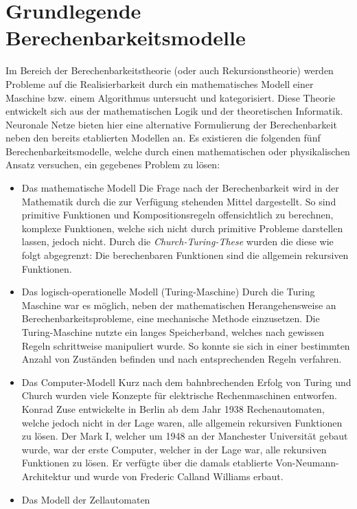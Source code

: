 \section{Grundlegende Berechenbarkeitsmodelle}
\label{sec:neuro_models}
	Im Bereich der Berechenbarkeitstheorie (oder auch Rekursionstheorie) werden Probleme auf die Realisierbarkeit durch ein mathematisches Modell einer Maschine bzw. einem Algorithmus untersucht und kategorisiert. Diese Theorie entwickelt sich aus der mathematischen Logik und der theoretischen Informatik. Neuronale Netze bieten hier eine alternative Formulierung der Berechenbarkeit neben den bereits etablierten Modellen an. Es existieren die folgenden fünf Berechenbarkeitsmodelle, welche durch einen mathematischen oder physikalischen Ansatz versuchen, ein gegebenes Problem zu lösen:
	\begin{itemize}
		\item Das mathematische Modell
			\subitem Die Frage nach der Berechenbarkeit wird in der Mathematik durch die zur Verfügung stehenden Mittel dargestellt. So sind primitive Funktionen und Kompositionsregeln offensichtlich zu berechnen, komplexe Funktionen, welche sich nicht durch primitive Probleme darstellen lassen, jedoch nicht. Durch die \textit{Church-Turing-These} \cite{Turing1936} wurden die diese wie folgt abgegrenzt: \glqq Die berechenbaren Funktionen sind die allgemein rekursiven Funktionen.\grqq
			\newpage
		\item Das logisch-operationelle Modell (Turing-Maschine)
			\subitem Durch die Turing Maschine \cite{Turing1936} war es möglich, neben der mathematischen Herangehensweise an Berechenbarkeitsprobleme, eine mechanische Methode einzusetzen. Die Turing-Maschine nutzte ein langes Speicherband, welches nach gewissen Regeln schrittweise manipuliert wurde. So konnte sie sich in einer bestimmten Anzahl von Zuständen befinden und nach entsprechenden Regeln verfahren.
		\item Das Computer-Modell
			\subitem Kurz nach dem bahnbrechenden Erfolg von Turing und Church wurden viele Konzepte für elektrische Rechenmaschinen entworfen. Konrad Zuse entwickelte in Berlin ab dem Jahr 1938 Rechenautomaten, welche jedoch nicht in der Lage waren, alle allgemein rekursiven Funktionen zu lösen. Der Mark I, welcher um 1948 an der Manchester Universität gebaut wurde, war der erste Computer, welcher in der Lage war, alle rekursiven Funktionen zu lösen. Er verfügte über die damals etablierte Von-Neumann-Architektur \cite{Neumann1945} und wurde von Frederic Calland Williams erbaut.
		\item Das Modell der Zellautomaten

\end{itemize}
